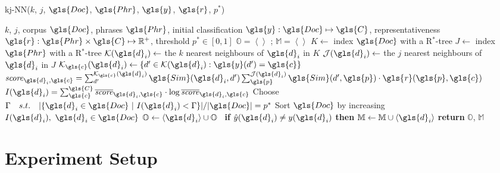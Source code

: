 \begin{algorithm}
	\footnotesize
	\caption{\gls{kj-NN}($k$, $j$, $\gls{Doc}$, $\gls{Phr}$, $\gls{y}$, $\gls{r}$, $p^*$)}\label{alg_kj-nnn} 
	\begin{algorithmic}[1]
		\Require $k$, $j$, corpus $\gls{Doc}$, phrases $\gls{Phr}$, initial classification $\gls{y}: \gls{Doc} \mapsto \gls{C}$, representativeness $\gls{r}: \gls{Phr} \times  \gls{C} \mapsto \mathbb{R}^+$, threshold $p^* \in [0,1]$ %
		\State $\mathbb{O} = \left \langle \right \rangle$ ; $\mathbb{M} = \left \langle \right \rangle$  
		\State $K \gets $ index $\gls{Doc}$ with a R$^*$-tree 
		\State $J \gets $ index $\gls{Phr}$ with a R$^*$-tree 
		 
		\State $\mathcal{K}(\gls{d}_i) \gets$ the $k$ nearest neighbours of $\gls{d}_i$ in $K$
		\State $\mathcal{J}(\gls{d}_i) \gets$  the $j$ nearest neighbours of $\gls{d}_i$ in $J$
		\EndFor
		 
		        \State $\mathcal{K}_{\gls{c}}(\gls{d}_i) \gets \{d' \in \mathcal{K}(\gls{d}_i) : \gls{y}(d') = \gls{c}\}$
		        \State $\mathit{score}_{\gls{d}_i,\gls{c}} = \sum_{d'}^{\mathcal{K}_{\gls{c}}(\gls{d}_i)} \gls{Sim}(\gls{d}_i,d') \sum_{\gls{p}}^{\mathcal{J}(\gls{d}_i)} \gls{Sim}(d',\gls{p}) \cdot \mathit{\gls{r}}(\gls{p},\gls{c})$
		    \EndFor
		    \State $I(\gls{d}_i) =  \sum_{\gls{c}}^{\gls{C}} \overline{\mathit{score}}_{\gls{d}_i,\gls{c}} \cdot \log  \overline{\mathit{score}}_{\gls{d}_i,\gls{c}}$
		\EndFor
		\State Choose $\Gamma \quad s.t. \quad |\{\gls{d}_i \in \gls{Doc}~|~I(\gls{d}_i) < \Gamma\}|/|\gls{Doc}| = p^* $
		\State Sort $\gls{Doc}$ by increasing $I(\gls{d}_i),~ \gls{d}_i \in \gls{Doc}$ 
		  
		     $\mathbb{O} \gets \left \langle \gls{d}_i \right \rangle \cup \mathbb{O}$ 
		    \Else~\textbf{if} $\hat{y}(\gls{d}_i) \neq y(\gls{d}_i)$ \textbf{then}
 $\mathbb{M} \gets \mathbb{M} \cup \left \langle \gls{d}_i \right \rangle$ 
		    \EndIf
		\EndFor
		\State \textbf{return} $\mathbb{O}$,  $\mathbb{M}$
	\end{algorithmic}
\end{algorithm}

\section{Experiment Setup}
\label{experimentsetup}

